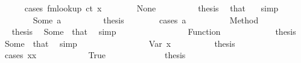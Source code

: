 \begin{isabellebody}
\ \ \ \ \isamarkupfalse%
\ {\isacharparenleft}{\kern0pt}cases\ {\isachardoublequoteopen}fmlookup\ ct\ x{\isachardoublequoteclose}{\isacharparenright}{\kern0pt}\isanewline
\ \ \ \ \ \ \isamarkupfalse%
\ None\isanewline
\ \ \ \ \ \ \isamarkupfalse%
\ \isamarkupfalse%
\ {\isacharquery}{\kern0pt}thesis\ \isamarkupfalse%
\ that\ {\isacharasterisk}{\kern0pt}{\isacharasterisk}{\kern0pt}\ \isamarkupfalse%
\ simp\isanewline
\ \ \ \ \isamarkupfalse%
\isanewline
\ \ \ \ \ \ \isamarkupfalse%
\ {\isacharparenleft}{\kern0pt}Some\ a{\isacharparenright}{\kern0pt}\isanewline
\ \ \ \ \ \ \isamarkupfalse%
\ \isamarkupfalse%
\ {\isacharquery}{\kern0pt}thesis\isanewline
\ \ \ \ \ \ \isamarkupfalse%
\ {\isacharparenleft}{\kern0pt}cases\ a{\isacharparenright}{\kern0pt}\isanewline
\ \ \ \ \ \ \ \ \isamarkupfalse%
\ {\isacharparenleft}{\kern0pt}Method\ {\isacharunderscore}{\kern0pt}{\isacharparenright}{\kern0pt}\isanewline
\ \ \ \ \ \ \ \ \isamarkupfalse%
\ \isamarkupfalse%
\ {\isacharquery}{\kern0pt}thesis\ \isamarkupfalse%
\ Some\ {\isacharasterisk}{\kern0pt}{\isacharasterisk}{\kern0pt}\ that\ \isamarkupfalse%
\ simp\isanewline
\ \ \ \ \ \ \isamarkupfalse%
\isanewline
\ \ \ \ \ \ \ \ \isamarkupfalse%
\ {\isacharparenleft}{\kern0pt}Function\ {\isacharunderscore}{\kern0pt}{\isacharparenright}{\kern0pt}\isanewline
\ \ \ \ \ \ \ \ \isamarkupfalse%
\ \isamarkupfalse%
\ {\isacharquery}{\kern0pt}thesis\ \isamarkupfalse%
\ Some\ {\isacharasterisk}{\kern0pt}{\isacharasterisk}{\kern0pt}\ that\ \isamarkupfalse%
\ simp\isanewline
\ \ \ \ \ \ \isamarkupfalse%
\isanewline
\ \ \ \ \ \ \ \ \isamarkupfalse%
\ {\isacharparenleft}{\kern0pt}Var\ x{}{\isacharparenright}{\kern0pt}\isanewline
\ \ \ \ \ \ \ \ \isamarkupfalse%
\ {\isacharquery}{\kern0pt}thesis\isanewline
\ \ \ \ \ \ \ \ \isamarkupfalse%
\ {\isacharparenleft}{\kern0pt}cases\ {\isachardoublequoteopen}x{\isacharequal}{\kern0pt}x{\isacharprime}{\kern0pt}{\isachardoublequoteclose}{\isacharparenright}{\kern0pt}\isanewline
\ \ \ \ \ \ \ \ \ \ \isamarkupfalse%
\ True\isanewline
\ \ \ \ \ \ \ \ \ \ \isamarkupfalse%
\ \isamarkupfalse%
\ {\isacharquery}{\kern0pt}thesis\ \isamarkupfalse%

\end{isabellebody}

